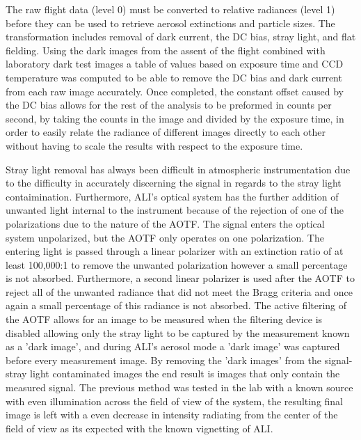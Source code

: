 \documentclass[12pt]{article}
\begin{document}
The raw flight data (level 0) must be converted to relative radiances (level 1) before they can be used to retrieve aerosol extinctions and particle sizes. The transformation includes removal of dark current, the DC bias, stray light, and flat fielding. Using the dark images from the assent of the flight combined with laboratory dark test images a table of values based on exposure time and CCD temperature was computed to be able to remove the DC bias and dark current from each raw image accurately. Once completed, the constant offset caused by the DC bias allows for the rest of the analysis to be preformed in counts per second, by taking the counts in the image and divided by the exposure time, in order to easily relate the radiance of different images directly to each other without having to scale the results with respect to the exposure time.

Stray light removal has always been difficult in atmospheric instrumentation due to the difficulty in accurately discerning the signal in regards to the stray light contaimination. Furthermore, ALI's optical system has the further addition of unwanted light internal to the instrument because of the rejection of one of the polarizations due to the nature of the AOTF. The signal enters the optical system unpolarized, but the AOTF only operates on one polarization. The entering light is passed through a linear polarizer with an extinction ratio of at least 100,000:1 to remove the unwanted polarization however a small percentage is not absorbed. Furthermore, a second linear polarizer is used after the AOTF to reject all of the unwanted radiance that did not meet the Bragg criteria and once again a small percentage of this radiance is not absorbed. The active filtering of the AOTF allows for an image to be measured when the filtering device is disabled allowing only the stray light to be captured by the measurement known as a 'dark image', and during ALI's aerosol mode a 'dark image' was captured before every measurement image. By removing the 'dark images' from the signal-stray light contaminated images the end result is images that only contain the measured signal. The previous method was tested in the lab with a known source with even illumination across the field of view of the system, the resulting final image is left with a even decrease in intensity radiating from the center of the field of view as its expected with the known vignetting of ALI.
\end{document}
